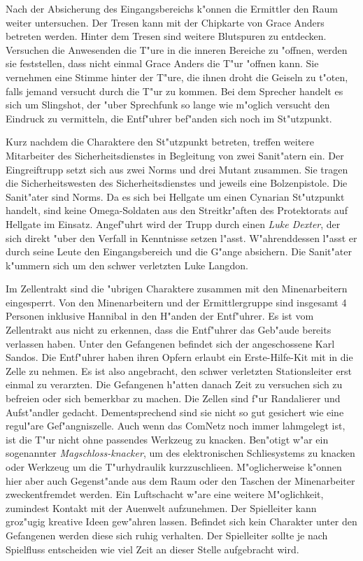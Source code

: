 
Nach der Absicherung des Eingangsbereichs k"onnen die Ermittler den Raum weiter untersuchen. Der Tresen kann mit der Chipkarte von Grace Anders betreten werden. Hinter dem Tresen sind weitere Blutspuren zu entdecken. Versuchen die Anwesenden die T"ure in die inneren Bereiche zu "offnen, werden sie feststellen, dass nicht einmal Grace Anders die T"ur "offnen kann. Sie vernehmen eine Stimme hinter der T"ure, die ihnen droht die Geiseln zu t"oten, falls jemand versucht durch die T"ur zu kommen. Bei dem Sprecher handelt es sich um Slingshot, der "uber Sprechfunk so lange wie m"oglich versucht den Eindruck zu vermitteln, die Entf"uhrer bef"anden sich noch im St"utzpunkt. 

Kurz nachdem die Charaktere den St"utzpunkt betreten, treffen weitere Mitarbeiter des Sicherheitsdienstes in Begleitung von zwei Sanit"atern ein. Der Eingreiftrupp setzt sich aus zwei Norms und drei Mutant zusammen. Sie tragen die Sicherheitswesten des Sicherheitsdienstes und jeweils eine Bolzenpistole. Die Sanit"ater sind Norms. Da es sich bei Hellgate um einen Cynarian St"utzpunkt handelt, sind keine Omega-Soldaten aus den Streitkr"aften des Protektorats auf Hellgate im Einsatz. Angef"uhrt wird der Trupp durch einen \emph{Luke Dexter}, der sich direkt "uber den Verfall in Kenntnisse setzen l"asst. W"ahrenddessen l"asst er durch seine Leute den Eingangsbereich und die G"ange absichern. Die Sanit"ater k"ummern sich um den schwer verletzten Luke Langdon.


Im Zellentrakt sind die "ubrigen Charaktere zusammen mit den Minenarbeitern eingesperrt. Von den Minenarbeitern und der Ermittlergruppe sind insgesamt 4 Personen inklusive Hannibal in den H"anden der Entf"uhrer. Es ist vom Zellentrakt aus nicht zu erkennen, dass die Entf"uhrer das Geb"aude bereits verlassen haben. Unter den Gefangenen befindet sich der angeschossene Karl Sandos. Die Entf"uhrer haben ihren Opfern erlaubt ein Erste-Hilfe-Kit mit in die Zelle zu nehmen. Es ist also angebracht, den schwer verletzten Stationsleiter erst einmal zu verarzten. Die Gefangenen h"atten danach Zeit zu versuchen sich zu befreien oder sich bemerkbar zu machen. Die Zellen sind f"ur Randalierer und Aufst"andler gedacht. Dementsprechend sind sie nicht so gut gesichert wie eine regul"are Gef"angniszelle. Auch wenn das ComNetz noch immer lahmgelegt ist, ist die T"ur nicht ohne passendes Werkzeug zu knacken. Ben"otigt w"ar ein sogenannter \emph{Magschloss-knacker}, um des elektronischen Schlie\3systems zu knacken oder Werkzeug um die T"urhydraulik kurzzuschlie\3en. M"oglicherweise k"onnen hier aber auch Gegenst"ande aus dem Raum oder den Taschen der Minenarbeiter zweckentfremdet werden. Ein Luftschacht w"are eine weitere M"oglichkeit, zumindest Kontakt mit der Au\3enwelt aufzunehmen. Der Spielleiter kann gro\3z"ugig kreative Ideen gew"ahren lassen. Befindet sich kein Charakter unter den Gefangenen werden diese sich ruhig verhalten. Der Spielleiter sollte je nach Spielfluss entscheiden wie viel Zeit an dieser Stelle aufgebracht wird. 


